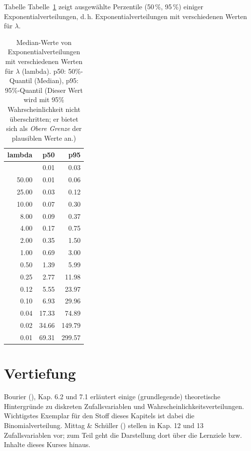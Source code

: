 \documentclass[
  ngerman,
  letterpaper,
  twoside,
  open=any]{scrbook}
\theoremstyle{definition}
\theoremstyle{plain}
\theoremstyle{definition}
\theoremstyle{definition}
\theoremstyle{definition}
\theoremstyle{definition}
\theoremstyle{remark}
\begin{document}
Tabelle Tabelle~\ref{tbl-exp} zeigt ausgewählte Perzentile (50\,\%,
95\,\%) einiger Exponentialverteilungen, d.\,h. Exponentialverteilungen
mit verschiedenen Werten für \(\lambda\).

{

\begin{longtable}[]{@{}rrr@{}}

\caption{\label{tbl-exp}Median-Werte von Exponentialverteilungen mit
verschiedenen Werten für \(\lambda\) (lambda). p50: 50\%-Quantil
(Median), p95: 95\%-Quantil (Dieser Wert wird mit 95\%
Wahrscheinlichkeit nicht überschritten; er bietet sich als \emph{Obere
Grenze} der plausiblen Werte an.)}

\tabularnewline

\toprule\noalign{}
lambda & p50 & p95 \\
\midrule\noalign{}
\endhead
\bottomrule\noalign{}
\endlastfoot
100.00 & 0.01 & 0.03 \\
50.00 & 0.01 & 0.06 \\
25.00 & 0.03 & 0.12 \\
10.00 & 0.07 & 0.30 \\
8.00 & 0.09 & 0.37 \\
4.00 & 0.17 & 0.75 \\
2.00 & 0.35 & 1.50 \\
1.00 & 0.69 & 3.00 \\
0.50 & 1.39 & 5.99 \\
0.25 & 2.77 & 11.98 \\
0.12 & 5.55 & 23.97 \\
0.10 & 6.93 & 29.96 \\
0.04 & 17.33 & 74.89 \\
0.02 & 34.66 & 149.79 \\
0.01 & 69.31 & 299.57 \\

\end{longtable}

}

\section{Vertiefung}\label{vertiefung-1}

Bourier (), Kap. 6.2 und 7.1 erläutert
einige (grundlegende) theoretische Hintergründe zu diskreten
Zufallsvariablen und Wahrscheinlichkeitsverteilungen. Wichtigstes
Exemplar für den Stoff dieses Kapitels ist dabei die Binomialverteilung.
Mittag \& Schüller () stellen in Kap. 12
und 13 Zufallsvariablen vor; zum Teil geht die Darstellung dort über die
Lernziele bzw. Inhalte dieses Kurses hinaus.
\end{document}
